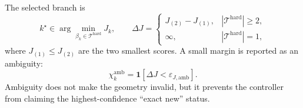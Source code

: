 \documentclass[12pt,a4paper]{report}
\begin{document}
The selected branch is
\begin{equation}
k^\star\in\arg\min_{\beta_k\in\mathcal{T}^{\mathrm{hard}}}J_k,
\qquad
\Delta J=
\begin{cases}
J_{(2)}-J_{(1)},&|\mathcal{T}^{\mathrm{hard}}|\geq2,\\
\infty,&|\mathcal{T}^{\mathrm{hard}}|=1,
\end{cases}
\tag{8.115}
\label{eq:ch8-branch-selection}
\end{equation}
where $J_{(1)}\leq J_{(2)}$ are the two smallest scores. A small margin is
reported as an ambiguity:
\begin{equation}
\chi_k^{\mathrm{amb}}
=\mathbf{1}\!\left[\Delta J<\varepsilon_{J,\mathrm{amb}}\right].
\tag{8.116}
\label{eq:ch8-ambiguity}
\end{equation}
Ambiguity does not make the geometry invalid, but it prevents the controller
from claiming the highest-confidence ``exact new'' status.
\end{document}
